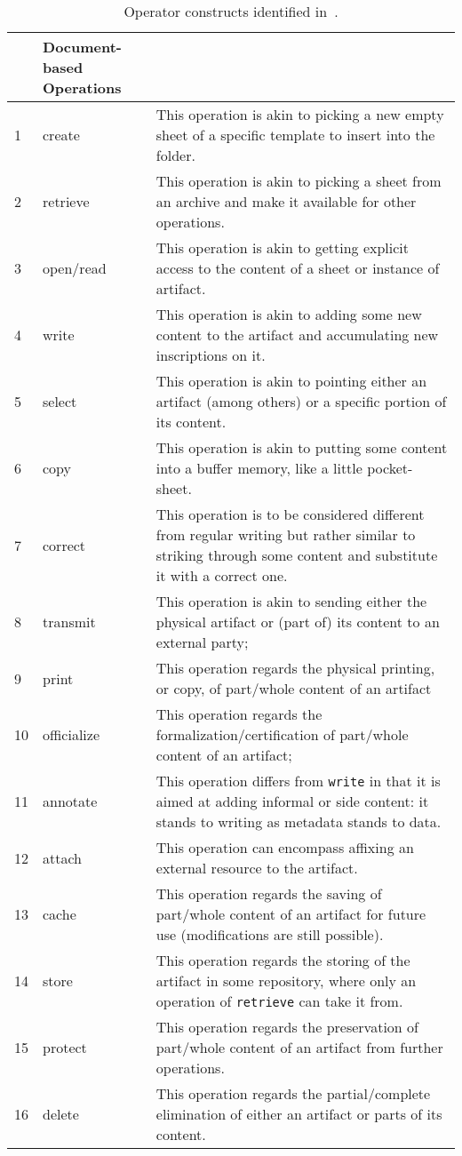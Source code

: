 \documentclass{article}
\begin{document}
\begin{table}
\scriptsize
\begin{threeparttable}
\begin{tabularx}{\textwidth}{llX}
\toprule 
 & \textbf{Document-based Operations}\tabularnewline
\midrule
1	& create & This operation is akin to picking a new empty sheet of a specific template to insert into the folder. \tabularnewline \midrule
2 & retrieve & This operation is akin to picking a sheet from an archive and make it available for other operations. \tabularnewline \midrule
3	& open/read & This operation is akin to getting explicit access to the content of a sheet or instance of artifact. \tabularnewline \midrule
4	& write & This operation is akin to adding some new content to the artifact and accumulating new inscriptions on it. \tabularnewline \midrule
5	& select	 & This operation is akin to pointing either an artifact (among others) or a specific portion of its content. \tabularnewline \midrule
6	& copy  &  This operation is akin to putting some content into a buffer memory, like a little pocket-sheet. \tabularnewline \midrule
7 & correct  & This operation is to be considered different from regular writing but rather similar to striking through some content and substitute it with a correct one. \tabularnewline \midrule
8 & transmit  &  This operation is akin to sending either the physical artifact or (part of) its content to an external party; \tabularnewline \midrule
9 & print  &  This operation regards the physical printing, or copy, of part/whole content of an artifact  \tabularnewline \midrule
10 & officialize  &  This operation regards the formalization/certification of part/whole content of an artifact; \tabularnewline \midrule
11 & annotate & This operation differs from \texttt{write} in that it is aimed at adding informal or side content: it stands to writing as metadata stands to data. \tabularnewline \midrule
12 & attach & This operation can encompass affixing an external resource to the artifact. \tabularnewline \midrule
13 & cache & This operation regards the saving of part/whole content of an artifact for future use (modifications are still possible). \tabularnewline \midrule
14 & store & This operation regards the storing of the artifact in some repository, where only an operation of \texttt{retrieve} can take it from. \tabularnewline \midrule
15 & protect & This operation regards the preservation of part/whole content of an artifact from further operations. \tabularnewline \midrule
16 & delete & This operation regards the partial/complete elimination of either an artifact or parts of its content. \tabularnewline
\bottomrule 
\end{tabularx}
\end{threeparttable}
\caption{Operator constructs identified in~\citep{cabitza_remain_2011}.}
\label{table:operations}
\end{table}
\end{document}
